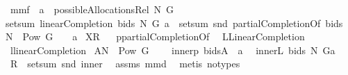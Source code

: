 \begin{isabellebody}
\isamarkupfalse%
\ mm{}{}f{\isacharcolon}\ \ {\isachardoublequoteopen}a\ {\isasymin}\ possibleAllocationsRel\ N\ G{\isachardoublequoteclose}\ \ \isanewline
{\isachardoublequoteopen}setsum\ {\isacharparenleft}linearCompletion{\isacharprime}\ bids\ N\ G{\isacharparenright}\ a\ {\isacharequal}\ setsum\ snd\ {\isacharparenleft}{\isacharparenleft}partialCompletionOf\ bids{\isacharparenright}\ {\isacharbackquote}\ {\isacharparenleft}{\isacharparenleft}N\ {\isasymtimes}\ {\isacharparenleft}Pow\ G\ {\isacharminus}\ {\isacharbraceleft}{\isacharbraceleft}{\isacharbraceright}{\isacharbraceright}{\isacharparenright}{\isacharparenright}\ {\isasyminter}\ a{\isacharparenright}{\isacharparenright}{\isachardoublequoteclose}\isanewline
{\isacharparenleft}\ {\isachardoublequoteopen}{\isacharquery}X{\isacharequal}{\isacharquery}R{\isachardoublequoteclose}{\isacharparenright}\isanewline
%
\isadelimproof
%
\endisadelimproof
%
\isatagproof
{}\isamarkupfalse%
\ {\isacharminus}\isanewline
{}\isamarkupfalse%
\ {\isacharquery}p{\isacharequal}partialCompletionOf\ \isamarkupfalse%
\ {\isacharquery}L{\isacharequal}LinearCompletion\ \isamarkupfalse%
\ {\isacharquery}l{\isacharequal}linearCompletion{\isacharprime}\isanewline
{}\isamarkupfalse%
\ {\isacharquery}A{\isacharequal}{\isachardoublequoteopen}N\ {\isasymtimes}\ {\isacharparenleft}Pow\ G\ {\isacharminus}\ {\isacharbraceleft}{\isacharbraceleft}{\isacharbraceright}{\isacharbraceright}{\isacharparenright}{\isachardoublequoteclose}\ \isamarkupfalse%
\ {\isacharquery}inner{}{\isacharequal}{\isachardoublequoteopen}{\isacharparenleft}{\isacharquery}p\ bids{\isacharparenright}{\isacharbackquote}{\isacharparenleft}{\isacharquery}A\ {\isasyminter}\ a{\isacharparenright}{\isachardoublequoteclose}\ \isamarkupfalse%
\ {\isacharquery}inner{}{\isacharequal}{\isachardoublequoteopen}{\isacharparenleft}{\isacharquery}L\ bids\ N\ G{\isacharparenright}{\isacharbar}{\isacharbar}a{\isachardoublequoteclose}\isanewline
{}\isamarkupfalse%
\ {\isachardoublequoteopen}{\isacharquery}R\ {\isacharequal}\ setsum\ snd\ {\isacharquery}inner{}{\isachardoublequoteclose}\ \isamarkupfalse%
\ assms\ mm{}{}d\ \isamarkupfalse%
\ {\isacharparenleft}metis\ {\isacharparenleft}no{\isacharunderscore}types{\isacharparenright}{\isacharparenright}\isanewline
{}\isamarkupfalse%

\end{isabellebody}
